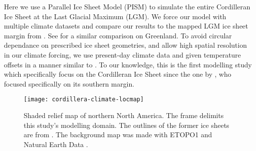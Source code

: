 Here we use a Parallel Ice Sheet Model (PISM) \citep{web:pism} to simulate the entire Cordilleran Ice Sheet at the Last Glacial Maximum (LGM). We force our model with multiple climate datasets and compare our results to the mapped LGM ice sheet margin from \citet{kleman-etal-2010}. See \citet{quiquet-etal-2012} for a similar comparison on Greenland. To avoid circular dependance on prescribed ice sheet geometries, and allow high spatial resolution in our climate forcing, we use present-day climate data and given temperature offsets in a manner similar to \citet{bintanja-etal-2005}. To our knowledge, this is the first modelling study which specifically focus on the Cordilleran Ice Sheet since the one by \citep{robert-1991}, who focused specifically on its southern margin.

\begin{figure}[t]
	\vspace*{2mm}
	\begin{center}
		\texttt{[image: cordillera-climate-locmap]}
	\end{center}
	\caption{Shaded relief map of northern North America. The frame delimits this study's modelling domain. The outlines of the former ice sheets are from \citet{kleman-etal-2010}. The background map was made with ETOPO1 \citep{data:etopo1} and Natural Earth Data \citep{data:naturalearth}.}
	\label{fig:locmap}
\end{figure}

